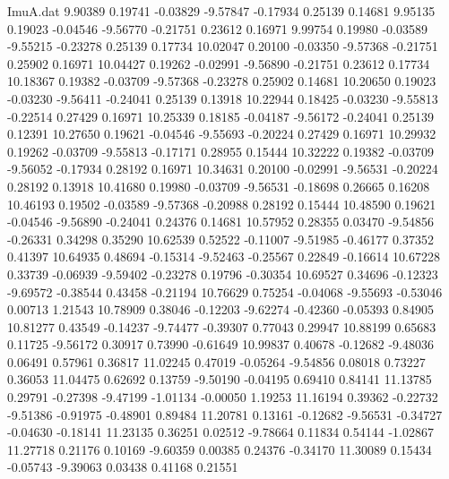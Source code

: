 \begin{filecontents}{ImuA.dat}
   9.90389    0.19741   -0.03829   -9.57847   -0.17934    0.25139    0.14681
   9.95135    0.19023   -0.04546   -9.56770   -0.21751    0.23612    0.16971
   9.99754    0.19980   -0.03589   -9.55215   -0.23278    0.25139    0.17734
  10.02047    0.20100   -0.03350   -9.57368   -0.21751    0.25902    0.16971
  10.04427    0.19262   -0.02991   -9.56890   -0.21751    0.23612    0.17734
  10.18367    0.19382   -0.03709   -9.57368   -0.23278    0.25902    0.14681
  10.20650    0.19023   -0.03230   -9.56411   -0.24041    0.25139    0.13918
  10.22944    0.18425   -0.03230   -9.55813   -0.22514    0.27429    0.16971
  10.25339    0.18185   -0.04187   -9.56172   -0.24041    0.25139    0.12391
  10.27650    0.19621   -0.04546   -9.55693   -0.20224    0.27429    0.16971
  10.29932    0.19262   -0.03709   -9.55813   -0.17171    0.28955    0.15444
  10.32222    0.19382   -0.03709   -9.56052   -0.17934    0.28192    0.16971
  10.34631    0.20100   -0.02991   -9.56531   -0.20224    0.28192    0.13918
  10.41680    0.19980   -0.03709   -9.56531   -0.18698    0.26665    0.16208
  10.46193    0.19502   -0.03589   -9.57368   -0.20988    0.28192    0.15444
  10.48590    0.19621   -0.04546   -9.56890   -0.24041    0.24376    0.14681
  10.57952    0.28355    0.03470   -9.54856   -0.26331    0.34298    0.35290
  10.62539    0.52522   -0.11007   -9.51985   -0.46177    0.37352    0.41397
  10.64935    0.48694   -0.15314   -9.52463   -0.25567    0.22849   -0.16614
  10.67228    0.33739   -0.06939   -9.59402   -0.23278    0.19796   -0.30354
  10.69527    0.34696   -0.12323   -9.69572   -0.38544    0.43458   -0.21194
  10.76629    0.75254   -0.04068   -9.55693   -0.53046    0.00713    1.21543
  10.78909    0.38046   -0.12203   -9.62274   -0.42360   -0.05393    0.84905
  10.81277    0.43549   -0.14237   -9.74477   -0.39307    0.77043    0.29947
  10.88199    0.65683    0.11725   -9.56172    0.30917    0.73990   -0.61649
  10.99837    0.40678   -0.12682   -9.48036    0.06491    0.57961    0.36817
  11.02245    0.47019   -0.05264   -9.54856    0.08018    0.73227    0.36053
  11.04475    0.62692    0.13759   -9.50190   -0.04195    0.69410    0.84141
  11.13785    0.29791   -0.27398   -9.47199   -1.01134   -0.00050    1.19253
  11.16194    0.39362   -0.22732   -9.51386   -0.91975   -0.48901    0.89484
  11.20781    0.13161   -0.12682   -9.56531   -0.34727   -0.04630   -0.18141
  11.23135    0.36251    0.02512   -9.78664    0.11834    0.54144   -1.02867
  11.27718    0.21176    0.10169   -9.60359    0.00385    0.24376   -0.34170
  11.30089    0.15434   -0.05743   -9.39063    0.03438    0.41168    0.21551

\end{filecontents}
